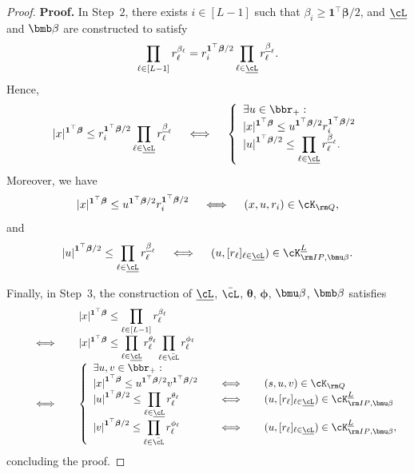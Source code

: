 \documentclass[mnsc, nonblindrev]{informswp}
\newcommand{\1}[1]{\mathds{1}{\left(#1\right)}}
\begin{document}
\begin{appendices}
\begin{proof}{\bf Proof.}
In Step~$2$, there exists $i \in [L-1]$ such that $\beta_i \geq \bm 1^\top \bm \beta/2$, and $\underline \cL$ and $\bmb \beta$ are constructed to satisfy 
$$
\prod_{\ell \in [L-1]} r^{\beta_\ell}_\ell  = r_i^{\bm 1^\top \bm \beta/2}\prod_{\ell \in \underline \cL} r^{\underline \beta_\ell}_\ell.
$$
Hence,
$$
|x|^{\bm 1^\top \bm \beta} \leq r_i^{\bm 1^\top \bm \beta/2}\prod_{\ell \in \underline \cL} r^{\underline \beta_\ell}_\ell 
~~~\iff~~~
\left\{
\begin{array}{l}
\exists u \in \bbr_+:\\
\displaystyle |x|^{\bm 1^\top \bm \beta} \leq {u}^{\bm 1^\top \bm \beta/2} r_i^{\bm 1^\top \bm \beta/2}\\
\displaystyle {|u|}^{\bm 1^\top \bm \beta/2} \leq  \prod_{\ell \in \underline \cL}r_\ell^{\underline \beta_\ell}.
\end{array}
\right.
$$
Moreover,  we have
$$
|x|^{\bm 1^\top \bm \beta} \leq {u}^{\bm 1^\top \bm \beta/2} r_i^{\bm 1^\top \bm \beta/2} 
~~~\iff~~~
(x,u,r_i) \in \cK_{\rm Q},
$$
and 
$$
{|u|}^{\bm 1^\top \bm \beta/2} \leq  \prod_{\ell \in \underline \cL}r_\ell^{\underline \beta_\ell} 
~~~\iff~~~
(u, [r_\ell]_{\ell \in \underline \cL}) \in \cK^{\underline L}_{{\rm IP},\bmu \beta}.
$$

Finally, in Step~$3$, the construction of $\underline \cL$, $\bar \cL$, $\bm \theta$, $\bm \phi$, $\bmu \beta$, $\bmb \beta$ satisfies
$$
\begin{array}{rcl}
&& \displaystyle |x|^{\bm 1^\top \bm \beta} \leq  \prod_{\ell \in [L-1]}r_\ell^{\beta_\ell} \\
&~~~\iff~~~& \displaystyle  
|x|^{\bm 1^\top \bm \beta}  \leq \prod_{\ell \in \underline \cL}r_\ell^{\theta_\ell}\prod_{\ell \in \bar \cL}r_\ell^{\phi_\ell}\\
&~~~\iff~~~&
\left\{
\begin{array}{lcl}
\exists u,v \in \bbr_+:\\
\displaystyle {|x|}^{\bm 1^\top \bm \beta} \leq {u}^{\bm 1^\top \bm \beta/2} {v}^{\bm 1^\top \bm \beta/2} &~~~\iff~~~& (s,u,v) \in \cK_{\rm Q}\\
\displaystyle {|u|}^{\bm 1^\top \bm \beta/2} \leq  \prod_{\ell \in \underline \cL}r_\ell^{\theta_\ell} &~~~\iff~~~& (u, [r_\ell]_{\ell \in \underline \cL}) \in \cK^{\underline L}_{{\rm IP},\bmu \beta} \\
\displaystyle  {|v|}^{\bm 1^\top \bm \beta/2} \leq  \prod_{\ell \in \bar \cL}r_\ell^{\phi_\ell} &~~~\iff~~~& (u, [r_\ell]_{\ell \in \underline \cL}) \in \cK^{\underline L}_{{\rm IP},\bmu \beta},
\end{array}\right.
\end{array}
$$
concluding the proof.
\hfill \Halmos
\end{proof}


\end{appendices}
\end{document}
